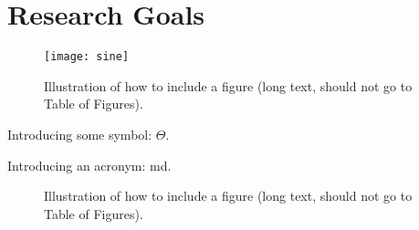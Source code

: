\section{Research Goals}

\begin{figure}[th!]
  \centering
  \medskip
  \texttt{[image: sine]}
  \caption[Short caption for Table of Figures]{Illustration of how to
  include a figure (long text, should not go to Table of Figures).}
  \label{fig:sine}
\end{figure}

Introducing some symbol: $\Theta$.

Introducing an acronym: \gls{md}.

\begin{figure}[th!]
  \centering
  
  \caption[Short caption for Table of Figures]{Illustration of how to
  include a figure (long text, should not go to Table of Figures).}
  \label{fig:test}
\end{figure}

\cleardoublepage

